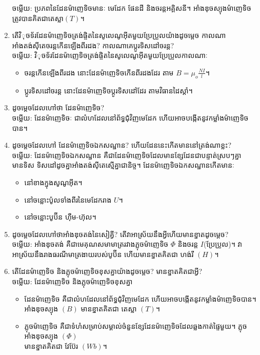 \documentclass{officialexam}
\begin{document}
\begin{enumerate}[m]
		{\color{red}\sffamily ចម្លើយ}: ប្រភពនៃដែនម៉ាញេទិចមានៈ មេដែក ផែនដី និងចរន្តអគ្គិសនី។
		អាំងឌុចស្យុងម៉ាញេទិច ត្រូវបានគិតជាតេស្លា$\left(T\right)$។
		\item តើវិុចទ័រដែនម៉ាញេទិចត្រង់ផ្ចិតនៃសូលេណូអុីតមួយប្រែប្រួលយ៉ាងដូចម្តេច កាលណាអាំងតង់សុីតេចរន្តកើនឡើងពីរដង? កាលណាគេប្តូរទិសដៅចរន្ត?\\
		{\color{red}\sffamily ចម្លើយ}: វិុចទ័រដែនម៉ាញេទិចត្រង់ផ្ចិតនៃសូលេណូអុីតមួយប្រែប្រួលកាលណាៈ
		\begin{itemize}
			\item ចរន្តកើនឡើងពីរដង នោះដែនម៉ាញេទិចកើនពីរដងដែរ តាម $B=\mu_o \frac{NI}{l}$។
			\item ប្តូរទិសដៅចរន្ត នោះដែនម៉ាញេទិចប្តូរទិសដៅដែរ តាមវិធានដៃស្ដាំ។
		\end{itemize}
		\item ដូចម្តេចដែលហៅថា ដែនម៉ាញេទិច?\\
		{\color{red}\sffamily ចម្លើយ}: ដែនម៉ាញេទិចៈ ជាលំហដែលនៅព័ទ្ធជុំវិញមេដែក ហើយអាចបង្កើតនូវកម្លាំងម៉ាញេទិចបាន។
		\item ដូចម្តេចដែលហៅ ដែនម៉ាញេទិចឯកសណ្ឋាន? ហើយដែននេះកើតមាននៅត្រង់ណាខ្លះ?\\
		{\color{red}\sffamily ចម្លើយ}: ដែនម៉ាញេទិចឯកសណ្ឋាន គឺជាដែនម៉ាញេទិចដែលមានខ្សែដែនជាបន្ទាត់ស្របៗគ្នា មានទិស ទិសដៅដូចគ្នាអាំងតង់សុីតេស្មើគ្នាជានិច្ច។ ដែនម៉ាញេទិចឯកសណ្ឋានកើតមានៈ
		\begin{itemize}
			\item នៅខាងក្នុងសូណូអុីត។
			\item នៅចន្លោះប៉ូលទាំងពីរនៃមេដែករាង $U$។
			\item នៅចន្លោះបូប៊ីន ហុឺម-ហ៊ុល។
		\end{itemize}
		\item ដូចម្តេចដែលហៅថាអាំងឌុចតង់នៃសៀគ្វី? តើវាអាស្រ័យនឹងអ្វីហើយមានខ្នាតដូចម្តេច?\\
		{\color{red}\sffamily ចម្លើយ}: អាំងឌុចតង់ គឺជាមេគុណសមាមាត្ររវាងភ្លុចម៉ាញេទិច $\Phi$ និងចរន្ត $I$(ប្រែប្រួល)។ វាអាស្រ័យនឹងរាងធរណីមាត្រងាយរបស់បូប៊ីន ហើយមានខ្នាតគិតជា ហង់រី $\left(H\right)$។
		\item តើដែនម៉ាញេទិច និងភ្លុចម៉ាញេទិចខុសគ្នាយ៉ាងដូចម្តេច? មានខ្នាតគិតជាអ្វី?\\
		{\color{red}\sffamily ចម្លើយ}: ដែនម៉ាញេទិច និងភ្លុចម៉ាញេទិចខុសគ្នា
		\begin{itemize}
			\item ដែនម៉ាញេទិច គឺជាលំហដែលនៅព័ទ្ធជុំវិញមេដែក ហើយអាចបង្កើតនូវកម្លាំងម៉ាញេទិចបាន។ អាំងឌុចស្យុង $\left(B\right)$ មានខ្នាតគិតជា តេស្លា $\left(T\right)$។
			\item ភ្លុចម៉ាញេទិច គឺជាទំហំសម្រាប់សម្គាល់ចំនួនខ្សែដែនម៉ាញេទិចដែលឆ្លងកាត់ផ្ទៃមួយ។ ភ្លុចអាំងឌុចស្យុង $\left(\Phi\right)$ \\មានខ្នាតគិតជា វែប៊ែរ $\left(Wb\right)$។

\end{itemize}
\end{enumerate}
\end{document}
